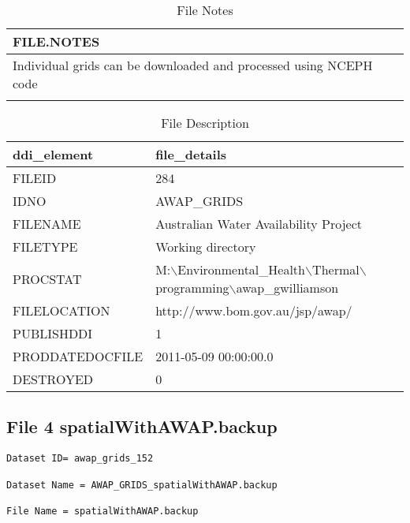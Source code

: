 \documentclass[a4paper]{article}
\begin{document}
\begin{table}[ht]
\begin{center}
\caption{File Notes}
\label{tab:tabx}
\begin{tabular}{p{10cm}}
  \hline
FILE.NOTES \\ 
  \hline
Individual grids can be downloaded and processed using NCEPH code
 \\ 
  
 \\ 
   \hline
\end{tabular}
\end{center}
\end{table}
\begin{table}[ht]
\begin{center}
\caption{File Description}
\label{tab:tabx}
\begin{tabular}{p{4cm}p{9cm}}
  \hline
ddi\_element & file\_details \\ 
  \hline
FILEID & 284 \\ 
  IDNO & AWAP\_GRIDS \\ 
  FILENAME & Australian Water Availability Project \\ 
  FILETYPE & Working directory \\ 
  PROCSTAT & M:$\backslash$Environmental\_Health$\backslash$Thermal$\backslash$programming$\backslash$awap\_gwilliamson \\ 
  FILELOCATION & http://www.bom.gov.au/jsp/awap/ \\ 
  PUBLISHDDI & 1 \\ 
  PRODDATEDOCFILE & 2011-05-09 00:00:00.0 \\ 
  DESTROYED & 0 \\ 
   \hline
\end{tabular}
\end{center}
\end{table}\clearpage
\subsection{File 4 spatialWithAWAP.backup}

\begin{verbatim}
Dataset ID= awap_grids_152

Dataset Name = AWAP_GRIDS_spatialWithAWAP.backup

File Name = spatialWithAWAP.backup
\end{verbatim}
\end{document}
